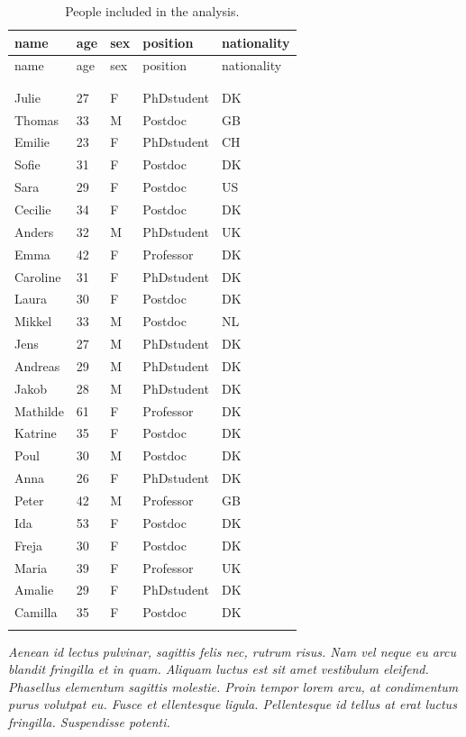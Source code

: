 \documentclass[
  a4paper,
]{scrbook}
\begin{document}
\begin{longtable}[]{@{}lllll@{}}

\toprule\noalign{}
name & age & sex & position & nationality \\
\midrule\noalign{}
\endfirsthead
\toprule\noalign{}
name & age & sex & position & nationality \\
\midrule\noalign{}
\endhead
\bottomrule\noalign{}
\tabularnewline
\caption{}\label{T_0b8ad}\tabularnewline
\endlastfoot
Julie & 27 & F & PhDstudent & DK \\
Thomas & 33 & M & Postdoc & GB \\
Emilie & 23 & F & PhDstudent & CH \\
Sofie & 31 & F & Postdoc & DK \\
Sara & 29 & F & Postdoc & US \\
Cecilie & 34 & F & Postdoc & DK \\
Anders & 32 & M & PhDstudent & UK \\
Emma & 42 & F & Professor & DK \\
Caroline & 31 & F & PhDstudent & DK \\
Laura & 30 & F & Postdoc & DK \\
Mikkel & 33 & M & Postdoc & NL \\
Jens & 27 & M & PhDstudent & DK \\
Andreas & 29 & M & PhDstudent & DK \\
Jakob & 28 & M & PhDstudent & DK \\
Mathilde & 61 & F & Professor & DK \\
Katrine & 35 & F & Postdoc & DK \\
Poul & 30 & M & Postdoc & DK \\
Anna & 26 & F & PhDstudent & DK \\
Peter & 42 & M & Professor & GB \\
Ida & 53 & F & Postdoc & DK \\
Freja & 30 & F & Postdoc & DK \\
Maria & 39 & F & Professor & UK \\
Amalie & 29 & F & PhDstudent & DK \\
Camilla & 35 & F & Postdoc & DK \\


\caption{\label{tbl-subjects}People included in the analysis.}

\tabularnewline
\end{longtable}

\emph{Aenean id lectus pulvinar, sagittis felis nec, rutrum risus. Nam
vel neque eu arcu blandit fringilla et in quam. Aliquam luctus est sit
amet vestibulum eleifend. Phasellus elementum sagittis molestie. Proin
tempor lorem arcu, at condimentum purus volutpat eu. Fusce et
ellentesque ligula. Pellentesque id tellus at erat luctus fringilla.
Suspendisse potenti.}
\end{document}
